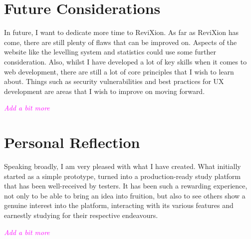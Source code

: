 \documentclass{report}
\begin{document}
\section{Future Considerations}

In future, I want to dedicate more time to ReviXion.
As far as ReviXion has come, there are still plenty of flaws that can be improved on.
Aspects of the website like the levelling system and statistics could use some further consideration.
Also, whilst I have developed a lot of key skills when it comes to web development, there are still a lot of core principles that I wish to learn about.
Things such as security vulnerabilities and best practices for UX development are areas that I wish to improve on moving forward.

\textcolor{magenta}{\textit{Add a bit more}}

\section{Personal Reflection}

Speaking broadly, I am very pleased with what I have created.
What initially started as a simple prototype, turned into a production-ready study platform that has been well-received by testers.
It has been such a rewarding experience, not only to be able to bring an idea into fruition,
but also to see others show a genuine interest into the platform,
interacting with its various features and earnestly studying for their respective endeavours.

\textcolor{magenta}{\textit{Add a bit more}}
\end{document}
